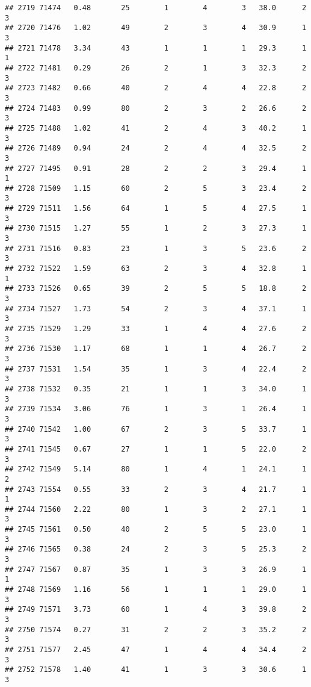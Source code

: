 \documentclass[
]{article}
\begin{document}
\begin{verbatim}
## 2719 71474   0.48       25        1        4        3   38.0      2      3
## 2720 71476   1.02       49        2        3        4   30.9      1      3
## 2721 71478   3.34       43        1        1        1   29.3      1      1
## 2722 71481   0.29       26        2        1        3   32.3      2      3
## 2723 71482   0.66       40        2        4        4   22.8      2      3
## 2724 71483   0.99       80        2        3        2   26.6      2      3
## 2725 71488   1.02       41        2        4        3   40.2      1      3
## 2726 71489   0.94       24        2        4        4   32.5      2      3
## 2727 71495   0.91       28        2        2        3   29.4      1      1
## 2728 71509   1.15       60        2        5        3   23.4      2      3
## 2729 71511   1.56       64        1        5        4   27.5      1      3
## 2730 71515   1.27       55        1        2        3   27.3      1      3
## 2731 71516   0.83       23        1        3        5   23.6      2      3
## 2732 71522   1.59       63        2        3        4   32.8      1      1
## 2733 71526   0.65       39        2        5        5   18.8      2      3
## 2734 71527   1.73       54        2        3        4   37.1      1      3
## 2735 71529   1.29       33        1        4        4   27.6      2      3
## 2736 71530   1.17       68        1        1        4   26.7      2      3
## 2737 71531   1.54       35        1        3        4   22.4      2      3
## 2738 71532   0.35       21        1        1        3   34.0      1      3
## 2739 71534   3.06       76        1        3        1   26.4      1      3
## 2740 71542   1.00       67        2        3        5   33.7      1      3
## 2741 71545   0.67       27        1        1        5   22.0      2      3
## 2742 71549   5.14       80        1        4        1   24.1      1      2
## 2743 71554   0.55       33        2        3        4   21.7      1      1
## 2744 71560   2.22       80        1        3        2   27.1      1      3
## 2745 71561   0.50       40        2        5        5   23.0      1      3
## 2746 71565   0.38       24        2        3        5   25.3      2      3
## 2747 71567   0.87       35        1        3        3   26.9      1      1
## 2748 71569   1.16       56        1        1        1   29.0      1      3
## 2749 71571   3.73       60        1        4        3   39.8      2      3
## 2750 71574   0.27       31        2        2        3   35.2      2      3
## 2751 71577   2.45       47        1        4        4   34.4      2      3
## 2752 71578   1.40       41        1        3        3   30.6      1      3

\end{verbatim}
\end{document}
